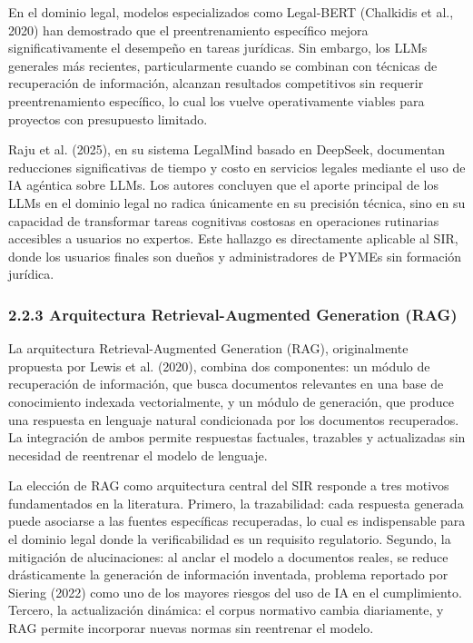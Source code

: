 \documentclass[12pt,a4paper,oneside]{report}
\begin{document}
En el dominio legal, modelos especializados como Legal-BERT (Chalkidis
et al., 2020) han demostrado que el preentrenamiento específico mejora
significativamente el desempeño en tareas jurídicas. Sin embargo, los
LLMs generales más recientes, particularmente cuando se combinan con
técnicas de recuperación de información, alcanzan resultados
competitivos sin requerir preentrenamiento específico, lo cual los
vuelve operativamente viables para proyectos con presupuesto limitado.

Raju et al. (2025), en su sistema LegalMind basado en DeepSeek,
documentan reducciones significativas de tiempo y costo en servicios
legales mediante el uso de IA agéntica sobre LLMs. Los autores concluyen
que el aporte principal de los LLMs en el dominio legal no radica
únicamente en su precisión técnica, sino en su capacidad de transformar
tareas cognitivas costosas en operaciones rutinarias accesibles a
usuarios no expertos. Este hallazgo es directamente aplicable al SIR,
donde los usuarios finales son dueños y administradores de PYMEs sin
formación jurídica.

\subsubsection{2.2.3 Arquitectura Retrieval-Augmented Generation
(RAG)}\label{arquitectura-retrieval-augmented-generation-rag}

La arquitectura Retrieval-Augmented Generation (RAG), originalmente
propuesta por Lewis et al. (2020), combina dos componentes: un módulo de
recuperación de información, que busca documentos relevantes en una base
de conocimiento indexada vectorialmente, y un módulo de generación, que
produce una respuesta en lenguaje natural condicionada por los
documentos recuperados. La integración de ambos permite respuestas
factuales, trazables y actualizadas sin necesidad de reentrenar el
modelo de lenguaje.

La elección de RAG como arquitectura central del SIR responde a tres
motivos fundamentados en la literatura. Primero, la trazabilidad: cada
respuesta generada puede asociarse a las fuentes específicas
recuperadas, lo cual es indispensable para el dominio legal donde la
verificabilidad es un requisito regulatorio. Segundo, la mitigación de
alucinaciones: al anclar el modelo a documentos reales, se reduce
drásticamente la generación de información inventada, problema reportado
por Siering (2022) como uno de los mayores riesgos del uso de IA en el
cumplimiento. Tercero, la actualización dinámica: el corpus normativo
cambia diariamente, y RAG permite incorporar nuevas normas sin
reentrenar el modelo.
\end{document}
